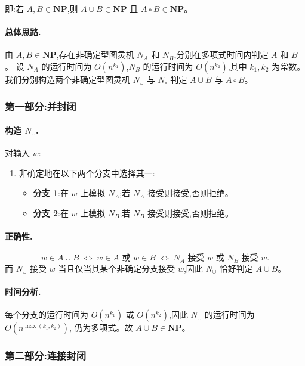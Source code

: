  
\begin{answerred}
即:若 $A, B \in \mathbf{NP}$,则 $A \cup B \in \mathbf{NP}$ 且 $A \circ B \in \mathbf{NP}$。
 
\paragraph{总体思路.}
由 $A, B \in \mathbf{NP}$,存在非确定型图灵机 $N_A$ 和 $N_B$,分别在多项式时间内判定 $A$ 和 $B$。
设 $N_A$ 的运行时间为 $O(n^{k_1})$,$N_B$ 的运行时间为 $O(n^{k_2})$,其中 $k_1, k_2$ 为常数。
我们分别构造两个非确定型图灵机 $N_\cup$ 与 $N_\circ$ 判定 $A \cup B$ 与 $A \circ B$。
 
\subsubsection*{第一部分:并封闭}
 
\paragraph{构造 $N_\cup$.} 对输入 $w$:
\begin{enumerate}
    \item 非确定地在以下两个分支中选择其一:
    \begin{itemize}
        \item \textbf{分支 1}:在 $w$ 上模拟 $N_A$;若 $N_A$ 接受则接受,否则拒绝。
        \item \textbf{分支 2}:在 $w$ 上模拟 $N_B$;若 $N_B$ 接受则接受,否则拒绝。
    \end{itemize}
\end{enumerate}
 
\paragraph{正确性.}
\[
    w \in A \cup B 
    \;\Longleftrightarrow\; w \in A \text{ 或 } w \in B 
    \;\Longleftrightarrow\; N_A \text{ 接受 } w \text{ 或 } N_B \text{ 接受 } w.
\]
而 $N_\cup$ 接受 $w$ 当且仅当其某个非确定分支接受 $w$,因此 $N_\cup$ 恰好判定 $A \cup B$。
 
\paragraph{时间分析.}
每个分支的运行时间为 $O(n^{k_1})$ 或 $O(n^{k_2})$,因此 $N_\cup$ 的运行时间为 $O(n^{\max(k_1, k_2)})$,
仍为多项式。故 $A \cup B \in \mathbf{NP}$。
 
\subsubsection*{第二部分:连接封闭}
 

\end{answerred}
